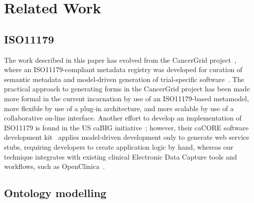 
\section{Related Work}

\subsection{ISO11179}

The work described in this paper has evolved from the CancerGrid
project~\cite{davi14}, where an ISO11179-compliant metadata registry
was developed for curation of semantic metadata and model-driven
generation of trial-specific software~\cite{davi12, Abler2011}. The
practical approach to generating forms in the CancerGrid project has
been made more formal in the current incarnation 
by use of an ISO11179-based metamodel, more
flexible by use of a plug-in architecture, and more scalable by use of a
collaborative on-line interface. 
Another effort to develop an
implementation of ISO11179 is found in the US caBIG
initiative~\cite{kunz09}; however, their 
caCORE software development kit~\cite{koma08}
applies model-driven development only to generate web service stubs,
requiring developers to create application logic by hand, whereas our
technique integrates with existing clinical Electronic Data Capture
tools and workflows, such as OpenClinica~\cite{oc}.

\subsection{Ontology modelling}


